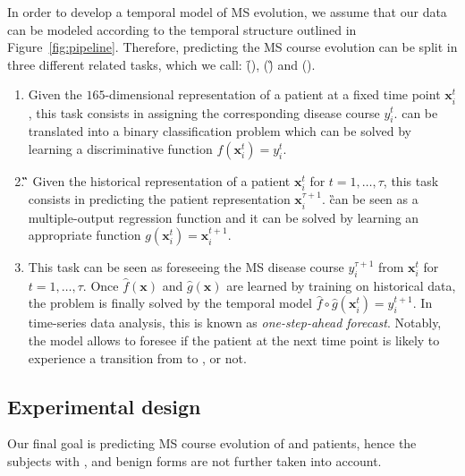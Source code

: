 In order to develop a temporal model of MS evolution, we assume that our data can be modeled according to the temporal structure outlined in Figure~\ref{fig:pipeline}.
Therefore, predicting the MS course evolution can be split in three different related tasks, which we call: \f (\F), \g (\G) and \fog (\FOG).





\begin{enumerate}
	\item[] \textbf{\F} Given the $165$-dimensional representation of a patient at a fixed time point $\bm{x}_i^t$, this task consists in assigning the corresponding disease course $y_i^t$. \F can be translated into a binary classification problem which can be solved by learning a discriminative function $f(\bm{x}_i^{t}) = y_i^{t}$.
	
	\item[] \textbf{\G} Given the historical representation  of a patient $\bm{x}_i^t$ for $t=1,\dots,\tau$, this task consists in predicting the patient representation $\bm{x}_i^{\tau+1}$. \G can be seen as a multiple-output regression function and it can be solved by learning an appropriate function $g(\bm{x}_i^{t}) = \bm{x}_i^{t+1}$.
	
	\item[] \textbf{\FOG} This task can be seen as foreseeing the MS disease course $y_i^{\tau+1}$ from $\bm{x}_i^t$ for $t=1,\dots,\tau$. Once $\hat{f}(\bm{x})$ and $\hat{g}(\bm{x})$ are learned by training on historical \PCO data, the \FOG problem is finally solved by the temporal model $\hat{f} \circ \hat{g}(\bm{x}_i^{t}) = y_i^{t+1}$. In time-series data analysis, this is known as \textit{one-step-ahead forecast}. Notably, the \FOG model allows to foresee if the patient at the next time point is likely to experience a transition from \RR to \SP, or not.

\end{enumerate}


\subsection{Experimental design}\label{sec:experimental_design}
Our final goal is predicting MS course evolution of  \RR and  \SP patients, hence the subjects with \PR, \PP and benign forms are not further taken into account.

